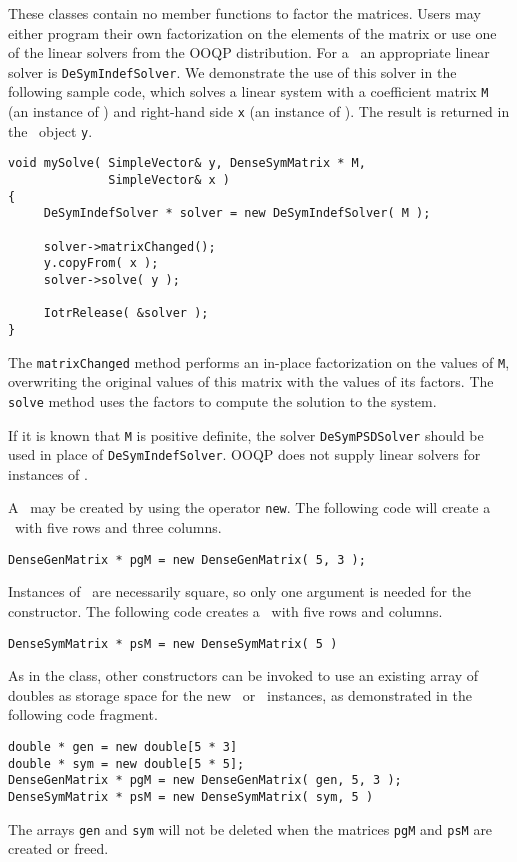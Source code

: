 These classes contain no member functions to factor the matrices.
Users may either program their own factorization on the elements of
the matrix or use one of the linear solvers from the OOQP
distribution. For a \DenseSymMatrix\ an appropriate linear solver is
\texttt{DeSymIndefSolver}. We demonstrate the use of this solver in
the following sample code, which solves a linear system with a
coefficient matrix \texttt{M} (an instance of \DenseSymMatrix) and
right-hand side \texttt{x} (an instance of \SimpleVector). The result
is returned in the \SimpleVector\ object \texttt{y}.
\begin{verbatim}
void mySolve( SimpleVector& y, DenseSymMatrix * M, 
              SimpleVector& x )
{
     DeSymIndefSolver * solver = new DeSymIndefSolver( M );

     solver->matrixChanged();
     y.copyFrom( x );
     solver->solve( y );

     IotrRelease( &solver );
}
\end{verbatim}
The \texttt{matrixChanged} method performs an in-place factorization
on the values of \texttt{M}, overwriting the original values of this
matrix with the values of its factors. The \texttt{solve} method uses
the factors to compute the solution to the system. 

If it is known that \texttt{M} is positive definite, the solver
\texttt{DeSymPSDSolver} should be used in place of
\texttt{DeSymIndefSolver}. OOQP does not supply linear solvers for
instances of \DenseGenMatrix.

A \DenseGenMatrix\ may be created by using the operator \texttt{new}. The
following code will create a \DenseGenMatrix\ with five rows and three
columns.
\begin{verbatim}
DenseGenMatrix * pgM = new DenseGenMatrix( 5, 3 );
\end{verbatim}
Instances of \DenseSymMatrix\ are necessarily square, so only one
argument is needed for the constructor. The following code creates a
\DenseSymMatrix\ with five rows and columns.
\begin{verbatim}
DenseSymMatrix * psM = new DenseSymMatrix( 5 )
\end{verbatim}
As in the \SimpleVector class, other constructors can be invoked
to use an existing array of doubles as storage space for the
new \DenseGenMatrix\ or \DenseSymMatrix\ instances, as demonstrated in
the following code fragment.
\begin{verbatim}
double * gen = new double[5 * 3]
double * sym = new double[5 * 5];
DenseGenMatrix * pgM = new DenseGenMatrix( gen, 5, 3 );
DenseSymMatrix * psM = new DenseSymMatrix( sym, 5 )
\end{verbatim}
The arrays \texttt{gen} and \texttt{sym} will not be deleted when the
matrices \texttt{pgM} and \texttt{psM} are created or
freed.

